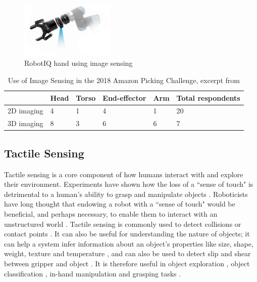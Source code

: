 \begin{figure}
    \centering
       \includegraphics[width=0.4\textwidth]{Images/robotiq-vision-guided-robotic-hand-system.png}
    \caption[RobotIQ hand using image sensing]{RobotIQ hand using image sensing \cite{RobotIQVisionPic}}
    \label{fig:RobotIQImageSensing}
\end{figure}

\begin{table}[ht]
\begin{tabular}{|l|l|l|l|l|l|}
            & Head & Torso & End-effector & Arm & Total respondents\\  \hline
2D imaging  & 4    & 1     & 4            & 1   & 20 \\  
3D imaging  & 8    & 3     & 6            & 6  & 7  
\end{tabular}
\caption[Use of Image Sensing in the 2018 Amazon Picking Challenge]{Use of Image Sensing in the 2018 Amazon Picking Challenge, excerpt from \label{table:APCSensorBreakdown}
\cite{APCObservations}}
\end{table}

\subsection{Tactile Sensing}

Tactile sensing is a core component of how humans interact with and explore their environment. Experiments have shown how the loss of a ``sense of touch" is detrimental to a human's ability to grasp and manipulate objects \cite{HumanTactile}. Roboticists have long thought that endowing a robot with a ``sense of touch" would be beneficial, and perhaps necessary, to enable them to interact with an unstructured world \cite{iCub}. Tactile sensing is commonly used to detect collisions or contact points \cite{ConveyorBelt}. It can also be useful for understanding the nature of objects; it can help a system infer information about an object's properties like size, shape, weight, texture and temperature \cite{ObjectExploration,Vizzy,uSkinFingertip,InHandCP, TactileMango}, and can also be used to detect slip and shear between gripper and object \cite{First3DHall,HumanstoHumanoids,Survey}. It is therefore useful in object exploration \cite{TSiCub,BimanualExploration}, object classification \cite{James}, in-hand manipulation \cite{InHandCP} and grasping tasks \cite{Gifu}. 

